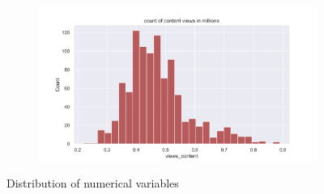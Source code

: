 \documentclass[12pt,a4paper]{style}
\begin{document}
\begin{figure}[h]
\begin{subfigure}[t]{0.49\textwidth}
	\caption{}
	\label{fig:trailer_views dist}
	\end{subfigure}
	\hfill
	\begin{subfigure}[t]{0.49\textwidth}
	\includegraphics[width=\textwidth]{content_views_dist.png}
	\caption{}
	\label{fig: content_views dist}
	\end{subfigure}
	\caption{Distribution of numerical variables}
	\label{fig: Distribution of numerical variables }
\end{figure}
\end{document}
